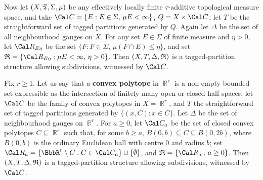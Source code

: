  Now let
\ifdim\pagewidth=390pt\penalty-1000\fi
$(X,\frak T,\Sigma,\mu)$ be any effectively locally finite
$\tau$-additive topological measure space, and take
$\Cal C=\{E:E\in\Sigma,\,\mu E<\infty\}$,
$Q=X\times\Cal C$;  let $T$ be the straightforward set of tagged
partitions generated by $Q$.   Again let
$\Delta$ be the set of all neighbourhood gauges on $X$.      For any set $E\in\Sigma$ of finite
measure and $\eta>0$, let $\Cal R_{E\eta}$ be the set
$\{F:F\in\Sigma,\,\mu(F\cap E)\le\eta\}$, and set
$\frak R=\{\Cal R_{E\eta}:\mu E<\infty,\,\eta>0\}$.   Then
$(X,T,\Delta,\frak R)$ is a tagged-partition structure allowing
subdivisions, witnessed by $\Cal C$.


 Fix $r\ge 1$.   Let us say
that a {\bf convex polytope} in $\BbbR^r$ is a non-empty bounded set
expressible as the intersection of finitely many open or closed
half-spaces;  let
$\Cal C$ be the family of convex polytopes in $X=\BbbR^r$, and $T$ the
straightforward set of tagged partitions generated by
$\{(x,C):x\in\overline{C}\}$.   Let $\Delta$ be the set of
neighbourhood gauges on $\BbbR^r$.   For $a\ge 0$, let $\Cal C_a$ be the
set of closed convex polytopes $C\subseteq\BbbR^r$ such that, for some
$b\ge a$, $B(0,b)\subseteq C\subseteq B(0,2b)$, where $B(0,b)$ is the
ordinary Euclidean ball with centre $0$ and radius $b$;  set
$\Cal R_a=\{\BbbR^r\setminus C:C\in\Cal C_a\}\cup\{\emptyset\}$, and
$\frak R=\{\Cal R_a:a\ge 0\}$.   Then $(X,T,\Delta,\frak R)$ is a
tagged-partition structure allowing subdivisions, witnessed by $\Cal C$.


